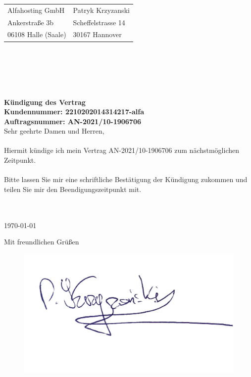 \documentclass{letter}
\begin{document}
\begin{letter}{}
\begin{tabular}{@{}p{3.0in}l}
Alfahosting GmbH   		& Patryk Krzyzanski\\
Ankerstraße 3b 			& Scheffelstrasse 14\\
06108 Halle (Saale)		& 30167 Hannover\\
\end{tabular}\\ \\ \\ \\
\bigskip
\\
\Large\textbf{K\"undigung des Vertrag}\\
\bigskip
\normalsize
\textbf{Kundennummer: 2210202014314217-alfa}\\
\textbf{Auftragsnummer: AN-2021/10-1906706}\\

Sehr geehrte Damen und Herren, \\\\

Hiermit kündige ich mein Vertrag  AN-2021/10-1906706 zum nächstmöglichen Zeitpunkt.\\\\
Bitte lassen Sie mir eine schriftliche Bestätigung der Kündigung zukommen und teilen Sie mir den Beendigungszeitpunkt mit.\\ \\
\\
\bigskip

\today
 
\closing{Mit freundlichen Grüßen}
\begin{figure}
  \includegraphics[width=0.5\linewidth]{podpis.jpg}
\end{figure}



\end{letter}
\end{document}
